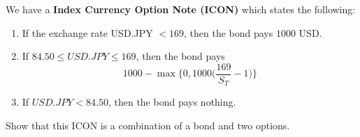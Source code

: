 \documentclass{article}
\begin{document}
      \begin{exercise}[Hull 1.23]
        We have a \textbf{Index Currency Option Note (ICON)} which states the following: 
        \begin{enumerate}
          \item If the exchange rate USD.JPY $ < 169$, then the bond pays $1000$ USD.
          \item If $84.50 \leq USD.JPY \leq 169$, then the bond pays 
            \begin{equation}
              1000 - \max\bigg\{ 0, 1000 \Big( \frac{169}{S_T} - 1 \Big)\bigg\}
            \end{equation}
          \item If $USD.JPY < 84.50$, then the bond pays nothing. 
        \end{enumerate}
        Show that this ICON is a combination of a bond and two options. 
      \end{exercise}
\end{document}
